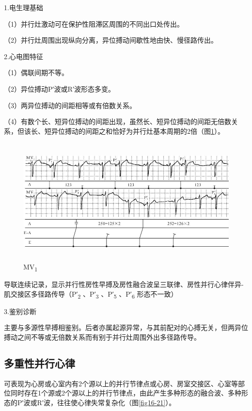 1.电生理基础

（1）并行灶激动可在保护性阻滞区周围的不同出口处传出。

（2）并行灶周围出现纵向分离，异位搏动间歇性地由快、慢径路传出。

2.心电图特征

（1）偶联间期不等。

（2）异位搏动P′波或R′波形态多变。

（3）两异位搏动的间距相等或有倍数关系。

（4）有数个长、短异位搏动的间距出现，虽然长、短异位搏动的间距无倍数关系，但该长、短异位搏动的间距之和恰好为并行灶基本周期的2倍（图\ref{fig16-20}）。

\begin{figure}[!htbp]
 \centering
 \includegraphics[width=5.64583in,height=2.52083in]{./images/Image00296.jpg}
 \captionsetup{justification=centering}
 \caption{MV\textsubscript{1}}
 \label{fig16-20}
  \end{figure} 
导联连续记录，显示并行性房性早搏及房性融合波呈三联律、房性并行心律伴异-肌交接区多径路传导（P′\textsubscript{2}
、P′\textsubscript{3} 、P′\textsubscript{5} 、P′\textsubscript{6}
形态不一致）

3.鉴别诊断

主要与多源性早搏相鉴别。后者亦属起源异常，与其前配对的心搏无关，但两异位搏动之间不等或无倍数关系而有别于并行灶周围外出多径路传导。

\protect\hypertarget{text00023.htmlux5cux23subid298}{}{}

\subsection{多重性并行心律}

可表现为心房或心室内有2个源以上的并行节律点或心房、房室交接区、心室等部位同时存在1个源或2个源以上的并行节律点，由此产生多种形态的融合波、多种形态的P′波或R′波，往往使心律失常复杂化（图\ref{fig16-21}）。

